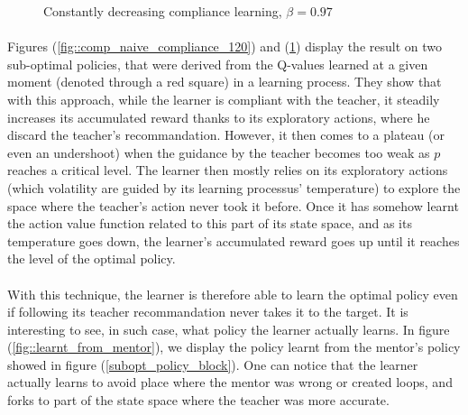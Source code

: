 \documentclass[a4paper]{report}
\begin{document}
{{{{\begin{figure}[h!]
\begin{minipage}{0.5\linewidth}
\begin{center}
						\caption{Constantly decreasing compliance learning, $\beta = 0.97$}
						\label{fig::comp_naive_compliance_50}
					\end{center}
				\end{minipage}
			\end{figure}
			
			\paragraph{} Figures (\ref{fig::comp_naive_compliance_120}) and (\ref{fig::comp_naive_compliance_50}) display the result on two sub-optimal policies, that were derived from the Q-values learned at a given moment (denoted through a red square) in a learning process. They show that with this approach, while the learner is compliant with the teacher, it steadily increases its accumulated reward thanks to its exploratory actions, where he discard the teacher's recommandation. However, it then comes to a plateau (or even an undershoot) when the guidance by the teacher becomes too weak as $p$ reaches a critical level. The learner then mostly relies on its exploratory actions (which volatility are guided by its learning processus' temperature) to explore the space where the teacher's action never took it before. Once it has somehow learnt the action value function related to this part of its state space, and as its temperature goes down, the learner's accumulated reward goes up until it reaches the level of the optimal policy. 
			
			\paragraph{} With this technique, the learner is therefore able to learn the optimal policy even if following its teacher recommandation never takes it to the target. It is interesting to see, in such case, what policy the learner actually learns. In figure (\ref{fig::learnt_from_mentor}), we display the policy learnt from the mentor's policy showed in figure (\ref{subopt_policy_block}). One can notice that the learner actually learns to avoid place where the mentor was wrong or created loops, and forks to part of the state space where the teacher was more accurate. 
			
}}}}
\end{document}
